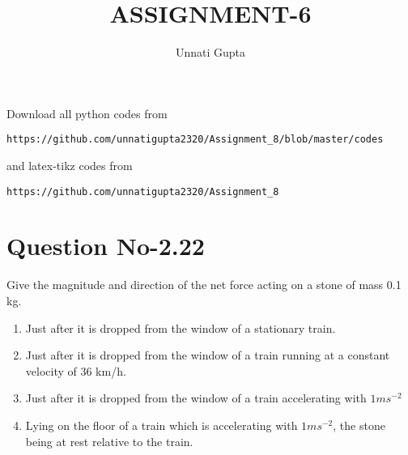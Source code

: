 \documentclass[journal,12pt,twocolumn]{IEEEtran}
\begin{document}
     \def\centbox#1{\makebox[0in]{#1}}
     \def\topbox#1{\raisebox{-\baselineskip}[0in][0in]{#1}}
     \def\midbox#1{\raisebox{-0.5\baselineskip}[0in][0in]{#1}}
\vspace{3cm}
\title{ASSIGNMENT-6}
\author{Unnati Gupta}
\maketitle
\newpage
\bigskip
\renewcommand{\thefigure}{\theenumi}
\renewcommand{\thetable}{\theenumi}
Download all python codes from 
\begin{lstlisting}
https://github.com/unnatigupta2320/Assignment_8/blob/master/codes
\end{lstlisting}
%
and latex-tikz codes from 
%
\begin{lstlisting}
https://github.com/unnatigupta2320/Assignment_8
\end{lstlisting}
%
\section{Question No-2.22}
Give the magnitude and direction of the net force acting on a stone of mass 0.1 kg.
\begin{enumerate}[label=\alph*.)]
    \item Just after it is dropped from the window of a stationary train.
    \item Just after it is dropped from the window of a train running at a constant velocity of 36 km/h.
    \item Just after it is dropped from the window of a train accelerating with $1 ms^{-2}$
    \item Lying on the floor of a train which is accelerating with $1ms^{-2}$, the stone being at rest relative to the train.
\end{enumerate}
%
\end{document}
